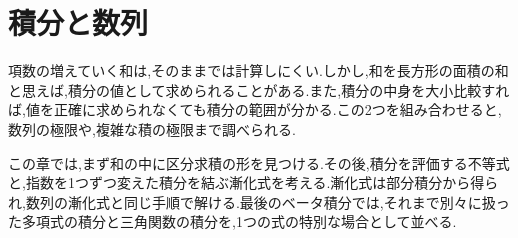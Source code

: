 \chapter{積分と数列}\label{章:積分と数列}

項数の増えていく和は,そのままでは計算しにくい.しかし,和を長方形の面積の和と思えば,積分の値として求められることがある.また,積分の中身を大小比較すれば,値を正確に求められなくても積分の範囲が分かる.この2つを組み合わせると,数列の極限や,複雑な積の極限まで調べられる.

この章では,まず和の中に区分求積の形を見つける.その後,積分を評価する不等式と,指数を1つずつ変えた積分を結ぶ漸化式を考える.漸化式は部分積分から得られ,数列の漸化式と同じ手順で解ける.最後のベータ積分では,それまで別々に扱った多項式の積分と三角関数の積分を,1つの式の特別な場合として並べる.

%
%
%
%
%
%
%
